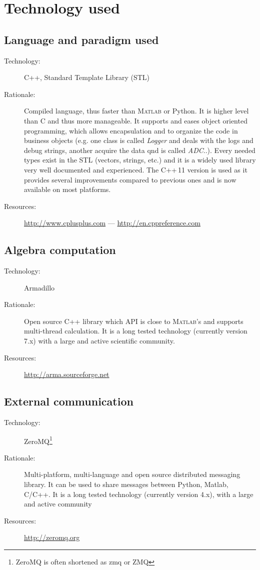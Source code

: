 \section{Technology used}

\subsection{Language and paradigm used}
\begin{description}
    \item[Technology:] C++, Standard Template Library (STL)
    \item[Rationale:] Compiled language, thus faster than \textsc{Matlab} or Python. It is higher level than C and thus more manageable. It supports and eases object oriented programming, which allows encapsulation and to organize the code in business objects (e.g. one class is called \textit{Logger} and deals with the logs and debug strings, another acquire the data qnd is called \textit{ADC}..). Every needed types exist in the STL (vectors, strings, etc.) and it is a widely used library very well documented and experienced. The C++\,11 version is used as it provides several improvements compared to previous ones and is now available on most platforms.
    \item[Resources:] \url{http://www.cplusplus.com} --- \url{http://en.cppreference.com}
\end{description}

\subsection{Algebra computation}
\begin{description}
    \item[Technology:] Armadillo
    \item[Rationale:] Open source C++ library which API is close to \textsc{Matlab}'s and supports multi-thread calculation. It is a long tested technology (currently version 7.x) with a large and active scientific community.
    \item[Resources:] \url{http://arma.sourceforge.net}
\end{description}

\subsection{External communication}
\begin{description}
   \item[Technology:] ZeroMQ\footnote{ZeroMQ is often shortened as zmq or ZMQ}
   \item[Rationale:] Multi-platform, multi-language and open source distributed messaging library. It can be used to share messages between Python, Matlab, C/C++. It is a long tested technology (currently version 4.x), with a large and active community
   \item[Resources:] \url{http://zeromq.org}
\end{description}

